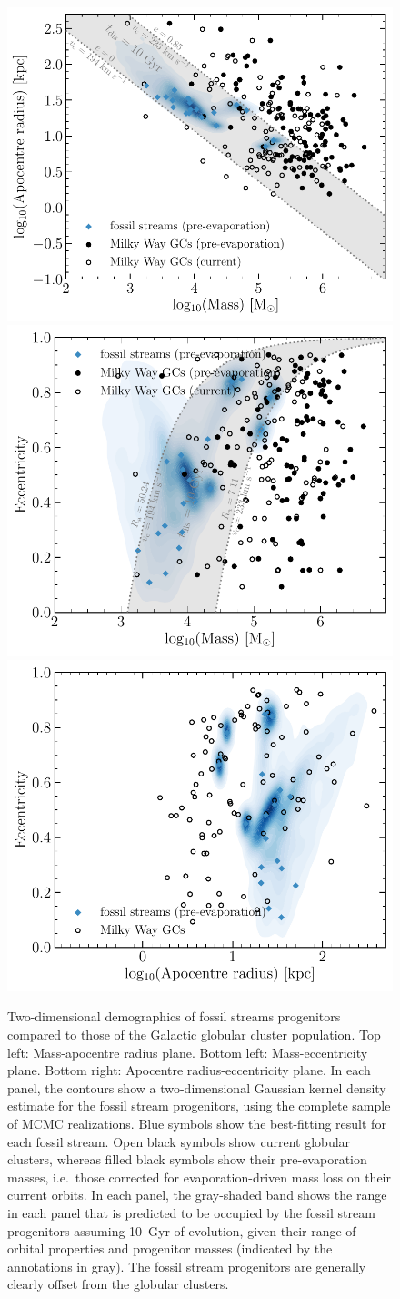 \documentclass[twocolumn]{aastex63}
\begin{document}
\begin{figure}
\includegraphics[width=0.5\hsize]{figures/mass_rapo.pdf}\\
\includegraphics[width=0.5\hsize]{figures/mass_ecc.pdf}%
\includegraphics[width=0.5\hsize]{figures/rapo_ecc.pdf}%
\caption{
\label{fig:kde}
Two-dimensional demographics of fossil streams progenitors compared to those of the Galactic globular cluster population. Top left: Mass-apocentre radius plane. Bottom left: Mass-eccentricity plane. Bottom right: Apocentre radius-eccentricity plane. In each panel, the contours show a two-dimensional Gaussian kernel density estimate for the fossil stream progenitors, using the complete sample of MCMC realizations. Blue symbols show the best-fitting result for each fossil stream. Open black symbols show current globular clusters, whereas filled black symbols show their pre-evaporation masses, i.e.\ those corrected for evaporation-driven mass loss on their current orbits. In each panel, the gray-shaded band shows the range in each panel that is predicted to be occupied by the fossil stream progenitors assuming 10~Gyr of evolution, given their range of orbital properties and progenitor masses (indicated by the annotations in gray). The fossil stream progenitors are generally clearly offset from the globular clusters.}
\end{figure}
\end{document}

